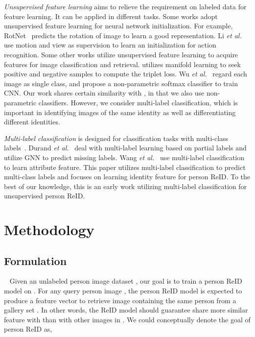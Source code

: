 \documentclass[10pt,twocolumn,letterpaper]{article}
\begin{document}
\emph{Unsupervised feature learning} aims to relieve the requirement on labeled data for feature learning. It can be applied in different tasks. Some works adopt unsupervised feature learning for neural network initialization. For example, RotNet~\cite{komodakis2018unsupervised} predicts the rotation of image to learn a good representation. Li \emph{et al.}~\cite{li2018unsupervised} use motion and view as supervision to learn an initialization for action recognition. Some other works utilize unsupervised feature learning to acquire features for image classification and retrieval. \cite{iscen2018mining} utilizes manifold learning to seek positive and negative samples to compute the triplet loss. Wu \emph{et al.}~\cite{wu2018unsupervised} regard each image as single class, and propose a non-parametric softmax classifier to train CNN. Our work shares certain similarity with \cite{wu2018unsupervised}, in that we also use non-parametric classifiers. However, we consider multi-label classification, which is important in identifying images of the same identity as well as differentiating different identities.

\emph{Multi-label classification} is designed for classification tasks with multi-class labels~\cite{zhang2013review,Durand_2019_CVPR,wang2018transferable,lin2018multi}. Durand \emph{et al.}~\cite{Durand_2019_CVPR} deal with multi-label learning based on partial labels and utilize GNN to predict missing labels. Wang \emph{et al.}~\cite{wang2018transferable,lin2018multi} use multi-label classification to learn attribute feature. This paper utilizes multi-label classification to predict multi-class labels and focuses on learning identity feature for person ReID. To the best of our knowledge, this is an early work utilizing multi-label classification for unsupervised person ReID.

\section{Methodology}
\subsection{Formulation} ~\label{sec:formulate}
Given an unlabeled person image dataset , our goal is to train a person ReID model on . For any query person image , the person ReID model is expected to produce a feature vector to retrieve image  containing the same person from a gallery set . In other words, the ReID model should guarantee  share more similar feature with  than with other images in . We could conceptually denote the goal of person ReID as,
\end{document}
